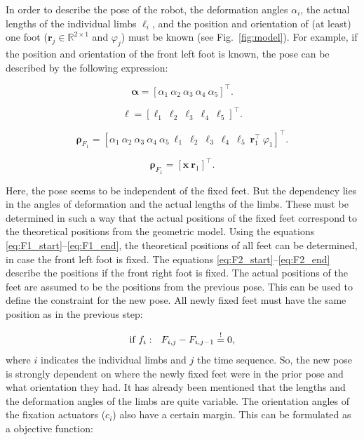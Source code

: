 \documentclass[10pt,a4paper]{article}
\begin{document}
In order to describe the pose of the robot, the deformation angles $\alpha_i$, the actual lengths of the individual limbs $\ell_i$, and the position and orientation of (at least) one foot ($\bm{r}_{j} \in \mathbb{R}^{2 \times 1}$ and $\varphi_{j}$) must be known (see Fig.~\ref{fig:model}).
For example, if the position and orientation of the front left foot is known, the pose can be described by the following expression:

\begin{equation}
\bm{\alpha} = \left[ \alpha_1~\alpha_2~\alpha_3~\alpha_4~\alpha_5 \right]^\top.
\end{equation}

\begin{equation}
\bm{\ell} = \left[ \ell_1~\ell_2~\ell_3~\ell_4~\ell_5 \right]^\top.
\end{equation}



\begin{equation}
\bm{\rho}_{F_1} = \left[ \alpha_1~\alpha_2~\alpha_3~\alpha_4~\alpha_5 ~\ell_1 ~\ell_2 ~\ell_3 ~\ell_4 ~\ell_5 ~\bm{r}^\top_{1} ~\varphi_1 \right]^\top.
\end{equation}

\begin{equation}
\bm{\rho}_{F_1} = \left[ \bm{x} ~\bm{r}_{1} \right]^\top.
\end{equation}

Here, the pose seems to be independent of the fixed feet. But the dependency lies in the angles of deformation and the actual lengths of the limbs. These must be determined in such a way that the actual positions of the fixed feet correspond to the theoretical positions from the geometric model.
Using the equations \eqref{eq:F1_start}--\eqref{eq:F1_end}, the theoretical positions of all feet can be determined, in case the front left foot is fixed. The equations \eqref{eq:F2_start}--\eqref{eq:F2_end} describe the positions if the front right foot is fixed.
The actual positions of the feet are assumed to be the positions from the previous pose.
This can be used to define the constraint for the new pose.
All newly fixed feet must have the same position as in the previous step:

\newcommand{\mbeq}{\overset{!}{=}}
\begin{equation}
\textnormal{if}~f_i:~~F_{i,j} - F_{i,j-1} \mbeq 0,
\label{eq:constraint}
\end{equation}
where $i$ indicates the individual limbs and $j$ the time sequence.
So, the new pose is strongly dependent on where the newly fixed feet were in the prior pose and what orientation they had.
It has already been mentioned that the lengths and the deformation angles of the limbs are quite variable. 
The orientation angles of the fixation actuators ($c_i$) also have a certain margin.
This can be formulated as a objective function:
\end{document}
